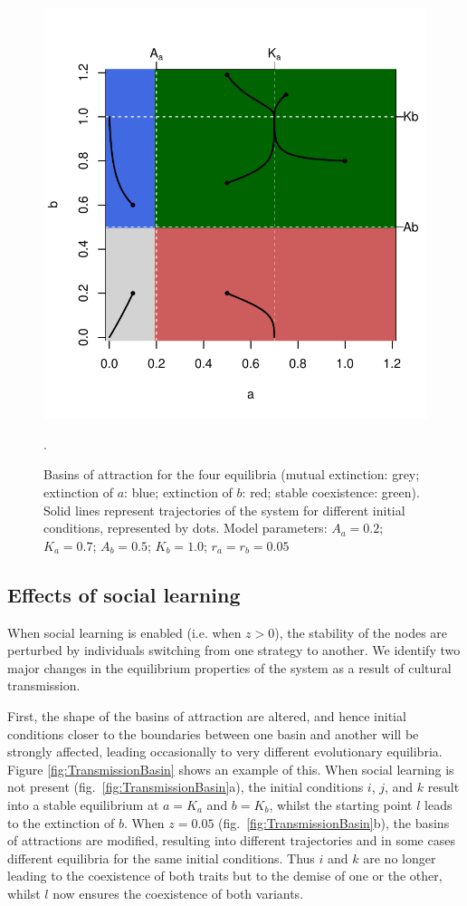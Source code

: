 \documentclass[review,authoryear]{elsarticle}
\begin{document}
\begin{figure}[h!]
  \centering
      \includegraphics[width=1\textwidth]{./figures/figure2.pdf}
  \caption{Basins of attraction for the four equilibria (mutual extinction: grey; extinction of $a$: blue; extinction of $b$: red; stable coexistence: green). Solid lines represent trajectories of the system for different initial conditions, represented by dots. Model parameters: $A_a=0.2$; $K_a=0.7$; $A_b=0.5$; $K_b=1.0$; $r_a=r_b=0.05$}.
    \label{fig:NoTransmissionBasin}
\end{figure}

\subsection{Effects of social learning}

When social learning is enabled (i.e. when $z>0$), the stability of the nodes are perturbed by individuals switching from one strategy to another. We identify two major changes in the equilibrium properties of the system as a result of cultural transmission. 

First, the shape of the basins of attraction are altered, and hence initial conditions closer to the boundaries between one basin and another will be strongly affected,  leading occasionally to very different evolutionary equilibria. Figure \ref{fig:TransmissionBasin} shows an example of this. When social learning is not present (fig.~\ref{fig:TransmissionBasin}a), the initial conditions $i$, $j$, and $k$ result into a stable equilibrium at $a=K_a$ and $b=K_b$, whilst the starting point $l$ leads to the extinction of $b$. When $z=0.05$ (fig.~\ref{fig:TransmissionBasin}b), the basins of attractions are modified, resulting into different trajectories and in some cases different equilibria for the same initial conditions. Thus $i$ and $k$ are no longer leading to the coexistence of both traits but to the demise of one or the other, whilst $l$ now ensures the coexistence of both variants. 
\end{document}
